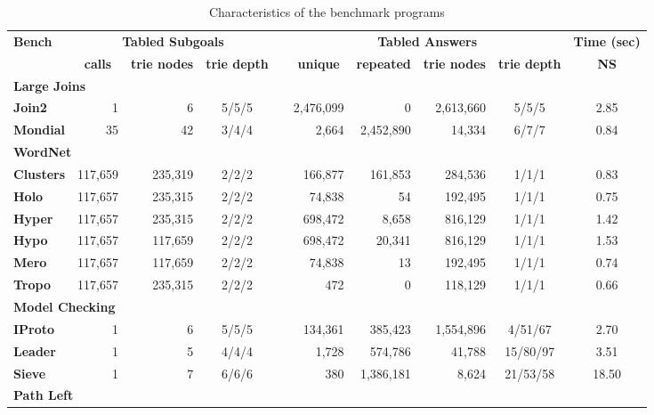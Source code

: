 \documentclass{llncs}
\begin{document}
\begin{table}[ht]
\centering
\caption{Characteristics of the benchmark programs}
\scalebox{0.82} { 
\begin{tabular}{lrrccrrrcc}
\hline\hline
\multirow{2}{*}{\bf Bench}
& \multicolumn{3}{c}{\bf Tabled Subgoals}
&
& \multicolumn{4}{c}{\bf Tabled Answers}
& \multicolumn{1}{c}{\bf Time (sec)} \\ \cline{2-4}\cline{6-9}
& \multicolumn{1}{c}{\bf calls}
& \multicolumn{1}{c}{\bf trie nodes}
& \multicolumn{1}{c}{\bf trie depth}
&
& \multicolumn{1}{c}{\bf unique}
& \multicolumn{1}{c}{\bf repeated}
& \multicolumn{1}{c}{\bf trie nodes}
& \multicolumn{1}{c}{\bf trie depth}
& \multicolumn{1}{c}{\bf NS} \\
\hline
\multicolumn{10}{l}{\bf Large Joins} \\
\bf{Join2}    &       1 &       6 & 5/5/5 && 2,476,099 &         0 &
2,613,660 &    5/5/5 &  2.85 \\
\bf{Mondial}  &      35 &      42 & 3/4/4 &&     2,664 & 2,452,890 &
   14,334 &    6/7/7 &  0.84 \\
\hline
\multicolumn{10}{l}{\bf WordNet} \\
\bf{Clusters} & 117,659 & 235,319 & 2/2/2 &&   166,877 &   161,853 &
284,536 &    1/1/1 &   0.83 \\
\bf{Holo}     & 117,657 & 235,315 & 2/2/2 &&    74,838 &        54 &
192,495 &    1/1/1 &   0.75 \\
\bf{Hyper}    & 117,657 & 235,315 & 2/2/2 &&   698,472 &     8,658 &
816,129 &    1/1/1 &   1.42 \\
\bf{Hypo}     & 117,657 & 117,659 & 2/2/2 &&   698,472 &    20,341 &
816,129 &    1/1/1 &   1.53 \\
\bf{Mero}     & 117,657 & 117,659 & 2/2/2 &&    74,838 &        13 &
192,495 &    1/1/1 &   0.74 \\
\bf{Tropo}    & 117,657 & 235,315 & 2/2/2 &&       472 &         0 &
118,129 &    1/1/1 &   0.66 \\
\hline
\multicolumn{10}{l}{\bf Model Checking} \\
\bf{IProto}   &       1 &       6 & 5/5/5 &&   134,361 &   385,423 &
1,554,896 &  4/51/67 & 2.70 \\
\bf{Leader}   &       1 &       5 & 4/4/4 &&     1,728 &   574,786 &
   41,788 & 15/80/97 & 3.51  \\
\bf{Sieve}    &       1 &       7 & 6/6/6 &&       380 & 1,386,181 &
    8,624 & 21/53/58 & 18.50 \\
\hline
\multicolumn{10}{l}{\bf Path Left} \\

\end{tabular}}
\end{table}
\end{document}
